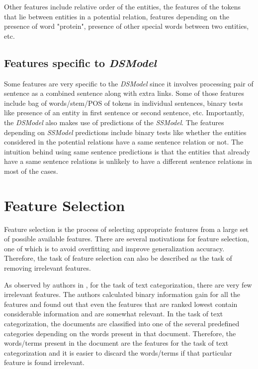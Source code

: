 Other features include relative order of the entities, the features of the tokens that lie between entities in a potential relation, features depending on the presence of word "protein", presence of other special words between two entities, etc.

\subsection*{Features specific to \textit{DSModel}}

Some features are very specific to the \textit{DSModel} since it involves processing pair of sentence as a combined sentence along with extra links. Some of those features include bag of words/stem/POS of tokens in individual sentences, binary tests like presence of an entity in first sentence or second sentence,  etc. Importantly, the \textit{DSModel} also makes use of predictions of the \textit{SSModel}. The features depending on \textit{SSModel} predictions include binary tests like whether the entities considered in the potential relations have a same sentence relation or not. The intuition behind using same sentence predictions is that the entities that already have a same sentence relations is unlikely to have a different sentence relations in most of the cases.

\section{Feature Selection}\label{sec:featSel}


Feature selection is the process of selecting appropriate features from a large set of possible available features. There are several motivations for feature selection, one of which is to avoid overfitting and improve generalization accuracy. Therefore, the task of feature selection can also be described as the task of removing irrelevant features.

%
%
%

As observed by authors in \cite{joachims1998text}, for the task of text categorization, there are very few irrelevant features. The authors calculated binary information gain for all the features and found out that even the features that are ranked lowest contain considerable information and are somewhat relevant. In the task of text categorization, the documents are classified into one of the several predefined categories depending on the words present in that document. Therefore, the words/terms present in the document are the features for the task of text categorization and it is easier to discard the words/terms if that particular feature is found irrelevant. 

